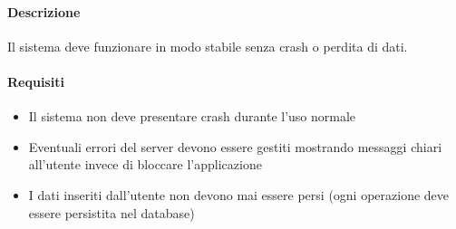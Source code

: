 \vspace{0.5cm}

\newpage


\begin{reqbox}[title=REQ-NFR-03: Affidabilità]
\label{subsubsec:req-nfr-reliability}

\paragraph{Descrizione}
Il sistema deve funzionare in modo stabile senza crash o perdita di dati.

\paragraph{Requisiti}
\begin{itemize}[leftmargin=1.1em]
\item Il sistema non deve presentare crash durante l'uso normale
\item Eventuali errori del server devono essere gestiti mostrando messaggi chiari all'utente invece di bloccare l'applicazione
\item I dati inseriti dall'utente non devono mai essere persi (ogni operazione deve essere persistita nel database)
\end{itemize}

\end{reqbox}

\vspace{0.5cm}


